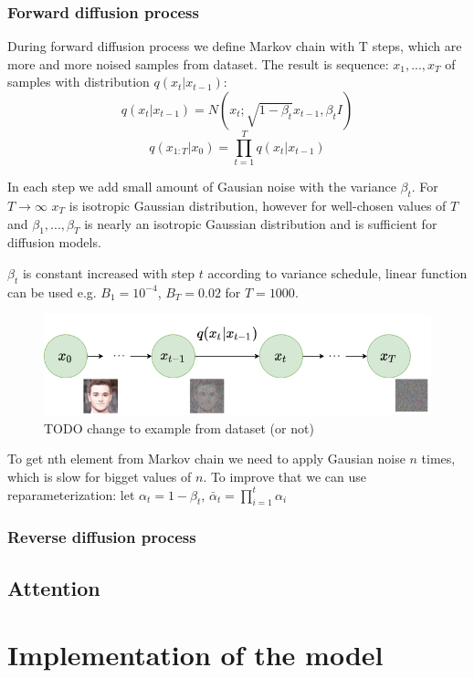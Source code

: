 \documentclass[11pt,a4paper]{report}
\begin{document}
\subsection{Forward diffusion process}
During forward diffusion process we define Markov chain with T steps, which are more and more noised samples from dataset. The result is sequence: $x_1,..., x_T$  of samples with distribution $q(x_t|x_{t-1})$:
\[ q(x_t|x_{t-1}) = N(x_t;\sqrt{1-\beta_t}x_{t-1}, \beta_tI) \]
\[ q(x_{1:T}|x_0) = \prod_{t=1}^{T}{q(x_t|x_{t-1})} \]

In each step we add small amount of Gausian noise with the variance $\beta_t$. For $T\rightarrow\infty$ $x_T$ is isotropic Gaussian distribution, however for well-chosen values of $T$ and $\beta_1,..., \beta_T$ is nearly an isotropic Gaussian distribution and is sufficient for diffusion models.

$\beta_t$ is constant increased with step $t$ according to variance schedule, linear function can be used e.g. $B_1=10^{-4}$, $B_T=0.02$ for $T=1000$. \cite{DDPM}

\begin{figure}[H]
	\centering
	\includegraphics[width=\textwidth]{images/forward-diffusion}
    \caption{\cite{DDPM} TODO change to example from dataset (or not)}
\end{figure}

To get nth element from Markov chain we need to apply Gausian noise $n$ times, which is slow for bigget values of $n$. To improve that we can use reparameterization: let $\alpha_t = 1 - \beta_t$, $\bar{\alpha}_t = \prod_{i=1}^{t}{\alpha_i}$

\subsection{Reverse diffusion process}

\section{Attention}


\chapter{Implementation of the model}
\end{document}

